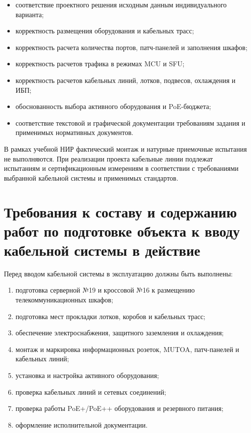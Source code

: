 \documentclass[a4paper,oneside,14pt]{extreport}
\begin{document}
\begin{appendices}
\begin{itemize}
    \item соответствие проектного решения исходным данным индивидуального варианта;
    \item корректность размещения оборудования и кабельных трасс;
    \item корректность расчета количества портов, патч-панелей и заполнения шкафов;
    \item корректность расчетов трафика в режимах MCU и SFU;
    \item корректность расчетов кабельных линий, лотков, подвесов, охлаждения и ИБП;
    \item обоснованность выбора активного оборудования и PoE-бюджета;
    \item соответствие текстовой и графической документации требованиям задания и применимых нормативных документов.
\end{itemize}

В рамках учебной НИР фактический монтаж и натурные приемочные испытания не выполняются. При реализации проекта кабельные линии подлежат испытаниям и сертификационным измерениям в соответствии с требованиями выбранной кабельной системы и применимых стандартов.


\section{Требования к составу и содержанию работ по подготовке объекта к вводу кабельной системы в действие}

Перед вводом кабельной системы в эксплуатацию должны быть выполнены:

\begin{enumerate}[label=\asbuk*)]
    \item подготовка серверной №19 и кроссовой №16 к размещению телекоммуникационных шкафов;
    \item подготовка мест прокладки лотков, коробов и кабельных трасс;
    \item обеспечение электроснабжения, защитного заземления и охлаждения;
    \item монтаж и маркировка информационных розеток, MUTOA, патч-панелей и кабельных линий;
    \item установка и настройка активного оборудования;
    \item проверка кабельных линий и сетевых соединений;
    \item проверка работы PoE+/PoE++ оборудования и резервного питания;
    \item оформление исполнительной документации.
\end{enumerate}


\end{appendices}
\end{document}
